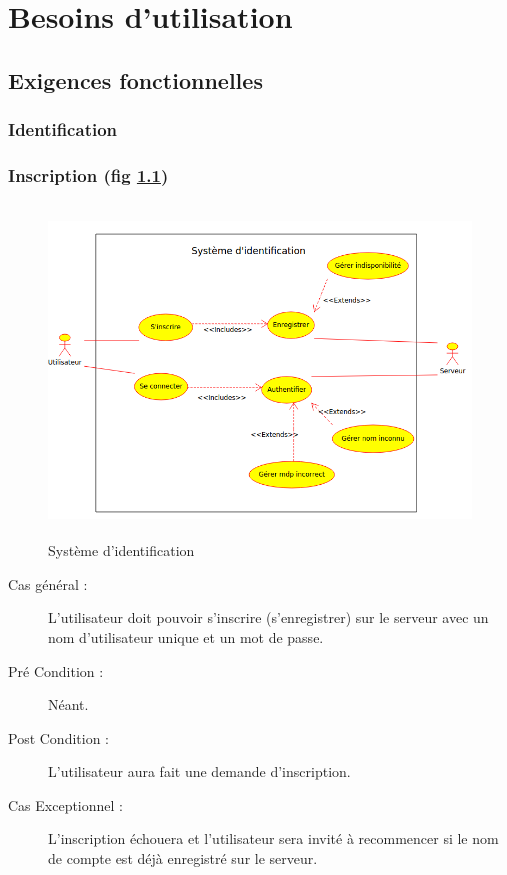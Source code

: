 \documentclass[a4paper]{report}
\begin{document}
\chapter{Besoins d'utilisation}
\section{Exigences fonctionnelles}

\subsection{Identification}

\subsection{Inscription (fig \ref{diag-use-inscription})}

\begin{figure}[H]
    \begin{center}
        \includegraphics[height=250pt]{uml/id.png}
        \caption{\label{diag-use-inscription} Système d'identification}
    \end{center}
\end{figure}

\begin{description}
    \item[Cas général  :] L'\gls{utilisateur} doit pouvoir s'inscrire (s'enregistrer) sur le \gls{serveur} avec un nom d'\gls{utilisateur} unique et un mot de passe.
    \item[Pré Condition  :] Néant.
    \item[Post Condition :] L'\gls{utilisateur} aura fait une demande d'inscription.
    \item[Cas Exceptionnel :] L'inscription échouera et l'\gls{utilisateur} sera invité à recommencer si le nom de compte est déjà enregistré sur le \gls{serveur}.
\end{description}
\end{document}
